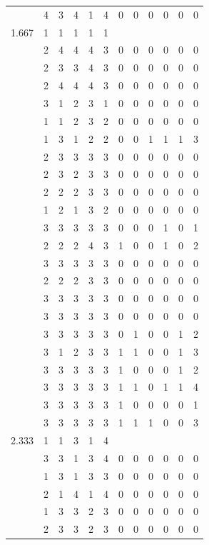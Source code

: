 \documentclass[]{book}
\theoremstyle{definition}
\theoremstyle{definition}
\theoremstyle{definition}
\theoremstyle{remark}
\begin{document}
\begin{table}
{\begin{tabular}[t]{rrrrrrrrrrrr}
 & 4 & 3 & 4 & 1 & 4 & 0 & 0 & 0 & 0 & 0 & 0\\
1.667 & 1 & 1 & 1 & 1 & 1 &  &  &  &  &  & \\
 & 2 & 4 & 4 & 4 & 3 & 0 & 0 & 0 & 0 & 0 & 0\\
 & 2 & 3 & 3 & 4 & 3 & 0 & 0 & 0 & 0 & 0 & 0\\
 & 2 & 4 & 4 & 4 & 3 & 0 & 0 & 0 & 0 & 0 & 0\\
 & 3 & 1 & 2 & 3 & 1 & 0 & 0 & 0 & 0 & 0 & 0\\
 & 1 & 1 & 2 & 3 & 2 & 0 & 0 & 0 & 0 & 0 & 0\\
 & 1 & 3 & 1 & 2 & 2 & 0 & 0 & 1 & 1 & 1 & 3\\
 & 2 & 3 & 3 & 3 & 3 & 0 & 0 & 0 & 0 & 0 & 0\\
 & 2 & 3 & 2 & 3 & 3 & 0 & 0 & 0 & 0 & 0 & 0\\
 & 2 & 2 & 2 & 3 & 3 & 0 & 0 & 0 & 0 & 0 & 0\\
 & 1 & 2 & 1 & 3 & 2 & 0 & 0 & 0 & 0 & 0 & 0\\
 & 3 & 3 & 3 & 3 & 3 & 0 & 0 & 0 & 1 & 0 & 1\\
 & 2 & 2 & 2 & 4 & 3 & 1 & 0 & 0 & 1 & 0 & 2\\
 & 3 & 3 & 3 & 3 & 3 & 0 & 0 & 0 & 0 & 0 & 0\\
 & 2 & 2 & 2 & 3 & 3 & 0 & 0 & 0 & 0 & 0 & 0\\
 & 3 & 3 & 3 & 3 & 3 & 0 & 0 & 0 & 0 & 0 & 0\\
 & 3 & 3 & 3 & 3 & 3 & 0 & 0 & 0 & 0 & 0 & 0\\
 & 3 & 3 & 3 & 3 & 3 & 0 & 1 & 0 & 0 & 1 & 2\\
 & 3 & 1 & 2 & 3 & 3 & 1 & 1 & 0 & 0 & 1 & 3\\
 & 3 & 3 & 3 & 3 & 3 & 1 & 0 & 0 & 0 & 1 & 2\\
 & 3 & 3 & 3 & 3 & 3 & 1 & 1 & 0 & 1 & 1 & 4\\
 & 3 & 3 & 3 & 3 & 3 & 1 & 0 & 0 & 0 & 0 & 1\\
 & 3 & 3 & 3 & 3 & 3 & 1 & 1 & 1 & 0 & 0 & 3\\
2.333 & 1 & 1 & 3 & 1 & 4 &  &  &  &  &  & \\
 & 3 & 3 & 1 & 3 & 4 & 0 & 0 & 0 & 0 & 0 & 0\\
 & 1 & 3 & 1 & 3 & 3 & 0 & 0 & 0 & 0 & 0 & 0\\
 & 2 & 1 & 4 & 1 & 4 & 0 & 0 & 0 & 0 & 0 & 0\\
 & 1 & 3 & 3 & 2 & 3 & 0 & 0 & 0 & 0 & 0 & 0\\
 & 2 & 3 & 3 & 2 & 3 & 0 & 0 & 0 & 0 & 0 & 0\\

\end{tabular}}
\end{table}
\end{document}

